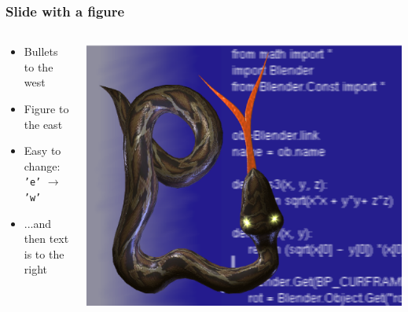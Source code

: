 \documentclass{beamer}
\begin{document}
\begin{frame}
\frametitle{Slide with a figure}


\begin{columns}
\begin{block}

\begin{itemize}
\item Bullets to the west
\item Figure to the east
\item Easy to change: \texttt{'e'} $\rightarrow$ \texttt{'w'}
\item ...and then text is to the right
\end{itemize}

\end{block}


\centerline{\includegraphics[width=1.000000\linewidth,keepaspectratio]{python1.ps}}

\end{columns}

\end{frame}
\end{document}
